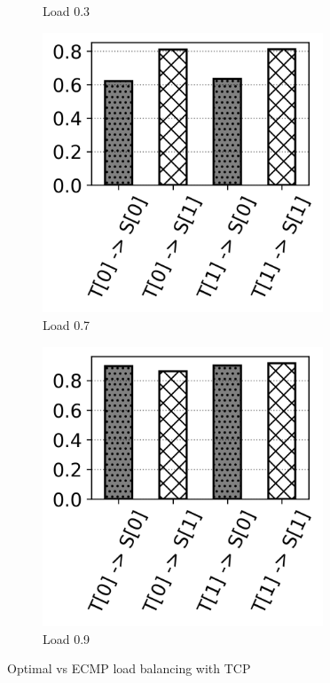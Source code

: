 \begin{figure}
\begin{subfigure}{.25\textwidth}
	\caption{Load 0.3}
	\end{subfigure}%
	\hfill
	\begin{subfigure}{.25\textwidth}
	\centering
	\includegraphics[width=0.92\textwidth]{Chapter4/Figures/opt_lb_lambda_07}
	\caption{Load 0.7}
	\end{subfigure}%
	\hfill
	\begin{subfigure}{.25\textwidth}
	\centering
	\includegraphics[width=0.92\textwidth]{Chapter4/Figures/opt_lb_lambda_09}
	\caption{Load 0.9}
	\end{subfigure}%
	\caption{Optimal vs ECMP load balancing with TCP}
	\label{fig:load-distrib-spines}
\end{figure}%
